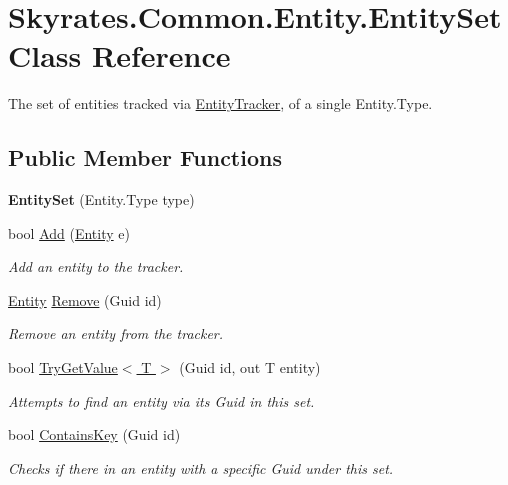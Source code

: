 \hypertarget{class_skyrates_1_1_common_1_1_entity_1_1_entity_set}{\section{Skyrates.\-Common.\-Entity.\-Entity\-Set Class Reference}
\label{class_skyrates_1_1_common_1_1_entity_1_1_entity_set}
}


The set of entities tracked via \hyperlink{class_skyrates_1_1_common_1_1_entity_1_1_entity_tracker}{Entity\-Tracker}, of a single Entity.\-Type.  


\subsection*{Public Member Functions}
\begin{DoxyCompactItemize}
\item 
\hypertarget{class_skyrates_1_1_common_1_1_entity_1_1_entity_set_ae7c88bc8e606540b024ab26f36c27a89}{{\bfseries Entity\-Set} (Entity.\-Type type)}\label{class_skyrates_1_1_common_1_1_entity_1_1_entity_set_ae7c88bc8e606540b024ab26f36c27a89}

\item 
bool \hyperlink{class_skyrates_1_1_common_1_1_entity_1_1_entity_set_ada2ceb002fa354ebf1b81a9948bd45c0}{Add} (\hyperlink{class_skyrates_1_1_common_1_1_entity_1_1_entity}{Entity} e)
\begin{DoxyCompactList}\small\item\em Add an entity to the tracker. \end{DoxyCompactList}\item 
\hyperlink{class_skyrates_1_1_common_1_1_entity_1_1_entity}{Entity} \hyperlink{class_skyrates_1_1_common_1_1_entity_1_1_entity_set_ad1375e6f998ad37978f3c013c7aaaf16}{Remove} (Guid id)
\begin{DoxyCompactList}\small\item\em Remove an entity from the tracker. \end{DoxyCompactList}\item 
bool \hyperlink{class_skyrates_1_1_common_1_1_entity_1_1_entity_set_adac6d4ae7606732e19a55d68930d9acc}{Try\-Get\-Value$<$ T $>$} (Guid id, out T entity)
\begin{DoxyCompactList}\small\item\em Attempts to find an entity via its Guid in this set. \end{DoxyCompactList}\item 
bool \hyperlink{class_skyrates_1_1_common_1_1_entity_1_1_entity_set_a3a52474105e7b401c538d7110a6d9f38}{Contains\-Key} (Guid id)
\begin{DoxyCompactList}\small\item\em Checks if there in an entity with a specific Guid under this set. \end{DoxyCompactList}\end{DoxyCompactItemize}
